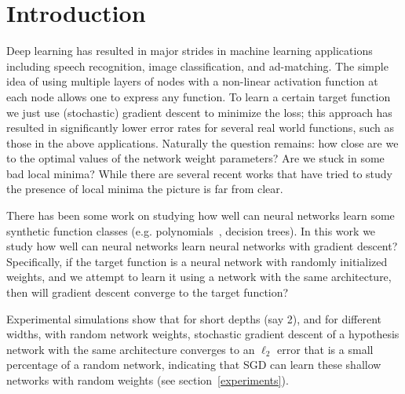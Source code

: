 \section{Introduction}


Deep learning has resulted in major strides in machine learning applications including speech recognition, image classification, and ad-matching. The simple idea of using multiple layers of nodes with a non-linear activation function at each node allows one to express any function.  To learn a certain target function we just use (stochastic) gradient descent to minimize the loss; this approach has resulted in significantly lower error rates for several real world functions, such as those in the above applications. Naturally the question remains: how close are we to the optimal values of the network weight parameters? Are we stuck in some bad local minima? While there are several recent works \cite{} that have tried to study the presence of local minima the picture is far from clear.

There has been some work on studying how well can neural networks learn some synthetic function classes (e.g. polynomials~\cite{}, decision trees). 
In this work we study how well can neural networks learn neural networks with gradient descent?
%
%
 Specifically, if the target function is a neural network with randomly initialized weights, and we attempt to learn it using a network with the same architecture, then will gradient descent converge to the target function?





Experimental simulations show that for short depths (say 2), and for different widths, with random network weights, stochastic gradient descent of a hypothesis network with the same architecture converges to an $\ell_2$ error that is a small percentage of a random network, indicating that SGD can learn these shallow networks with random weights (see section~\ref{experiments}). 

